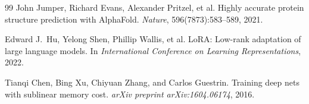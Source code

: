 \documentclass[11pt,a4paper]{article}
\begin{document}
\begin{thebibliography}{99}
John Jumper, Richard Evans, Alexander Pritzel, et al.
\newblock Highly accurate protein structure prediction with AlphaFold.
\newblock \emph{Nature}, 596(7873):583--589, 2021.

Edward J.\ Hu, Yelong Shen, Phillip Wallis, et al.
\newblock LoRA: Low-rank adaptation of large language models.
\newblock In \emph{International Conference on Learning Representations}, 2022.

Tianqi Chen, Bing Xu, Chiyuan Zhang, and Carlos Guestrin.
\newblock Training deep nets with sublinear memory cost.
\newblock \emph{arXiv preprint arXiv:1604.06174}, 2016.

\end{thebibliography}
\end{document}
